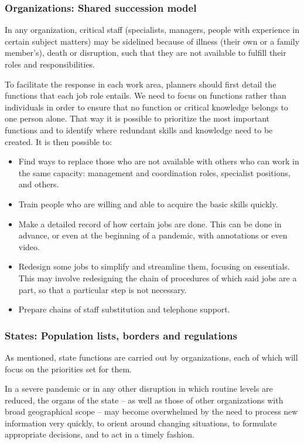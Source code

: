\documentclass[12pt, a4]{scrartcl}
\begin{document}
\subsubsection{Organizations: Shared succession model}
In any organization, critical staff (specialists, managers, people with experience in certain subject matters) may be sidelined because of illness (their own or a family member's), death or disruption, such that they are not available to fulfill their roles and responsibilities. 

To facilitate the response in each work area, planners should first detail the functions that each job role entails. We need to focus on functions rather than individuals in order to ensure that no function or critical knowledge belongs to one person alone. That way it is possible to prioritize the most important functions and to identify where redundant skills and knowledge need to be created. It is then possible to:
\begin{itemize}
	\item Find ways to replace those who are not available with others who can work in the same capacity: management and coordination roles, specialist positions, and others.
	\item Train people who are willing and able to acquire the basic skills quickly.
	\item Make a detailed record of how certain jobs are done. This can be done in advance, or even at the beginning of a pandemic, with annotations or even video.
	\item Redesign some jobs to simplify and streamline them, focusing on essentials. This may involve redesigning the chain of procedures of which said jobs are a part, so that a particular step is not necessary.
	\item Prepare chains of staff substitution and telephone support.
\end{itemize}

\subsubsection{States: Population lists, borders and regulations}
As mentioned, state functions are carried out by organizations, each of which will focus on the priorities set for them.

In a severe pandemic or in any other disruption in which routine levels are reduced, the organs of the state – as well as those of other organizations with broad geographical scope – may become overwhelmed by the need to process new information very quickly, to orient around changing situations, to formulate appropriate decisions, and to act in a timely fashion.
\end{document}
